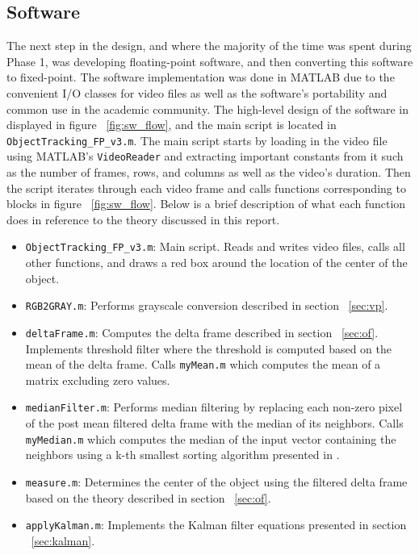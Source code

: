 \documentclass[11pt]{article} %
\begin{document}
\subsection{Software}
\label{sec:software}
The next step in the design, and where the majority of the time was spent during Phase 1, was developing floating-point software, and then converting this software to fixed-point. The software implementation was done in MATLAB due to the convenient I/O classes for video files as well as the software's portability and common use in the academic community. The high-level design of the software in displayed in figure ~\ref{fig:sw_flow}, and the main script is located in \texttt{ObjectTracking\_FP\_v3.m}. The main script starts by loading in the video file using MATLAB's \texttt{VideoReader} and extracting important constants from it such as the number of frames, rows, and columns as well as the video's duration. Then the script iterates through each video frame and calls functions corresponding to blocks in figure ~\ref{fig:sw_flow}. Below is a brief description of what each function does in reference to the theory discussed in this report.
\begin{itemize}
\item[] \texttt{ObjectTracking\_FP\_v3.m}: Main script. Reads and writes video files, calls all other functions, and draws a red box around the location of the center of the object.
\item[] \texttt{RGB2GRAY.m}: Performs grayscale conversion described in section ~\ref{sec:vp}.
\item[] \texttt{deltaFrame.m}: Computes the delta frame described in section ~\ref{sec:of}. Implements threshold filter where the threshold is computed based on the mean of the delta frame. Calls \texttt{myMean.m} which computes the mean of a matrix excluding zero values.
\item[] \texttt{medianFilter.m}: Performs median filtering by replacing each non-zero pixel of the post mean filtered delta frame with the median of its neighbors. Calls \texttt{myMedian.m} which computes the median of the input vector containing the neighbors using a k-th smallest sorting algorithm presented in \cite{11}.
\item[] \texttt{measure.m}: Determines the center of the object using the filtered delta frame based on the theory described in section ~\ref{sec:of}.
\item[] \texttt{applyKalman.m}: Implements the Kalman filter equations presented in section ~\ref{sec:kalman}.
\end{itemize}
\end{document}
